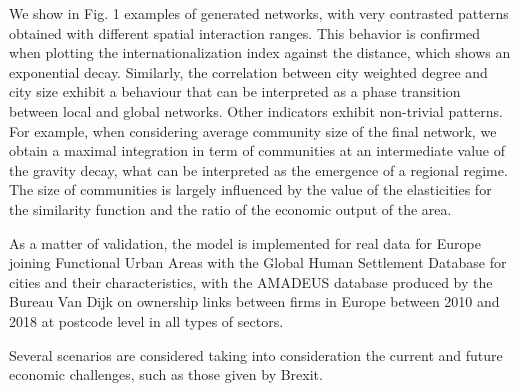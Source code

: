 \documentclass[10pt,letterpaper]{article}
\newcommand{\ea}[1]{{\color{blue}  #1}}
\begin{document}
We show in Fig. 1 examples of generated networks, with very contrasted patterns obtained with different spatial interaction ranges. This behavior is confirmed when plotting the internationalization index against 
\ea{the distance}, which shows an exponential decay. Similarly, the correlation between city weighted degree and city size exhibit a behaviour that can be interpreted as a phase transition between local and global networks. Other indicators exhibit non-trivial patterns. For example, when considering average community size of the final network, we obtain a maximal integration in term of communities at an intermediate value of the gravity decay, what can be interpreted as the emergence of a regional regime. 
\ea{The size of communities is largely influenced by the value of the elasticities for the similarity function and the ratio of the economic output of the area.}

\ea{As a matter of validation, the model is implemented for real data for Europe}
joining Functional Urban Areas with the Global Human Settlement Database for cities and their characteristics, with the AMADEUS database produced by the Bureau Van Dijk on ownership links between firms in Europe between 2010 and 2018 at postcode level in all types of sectors.


\ea{Several scenarios are considered taking into consideration the current and future economic challenges, such as those given by Brexit.}
\end{document}

